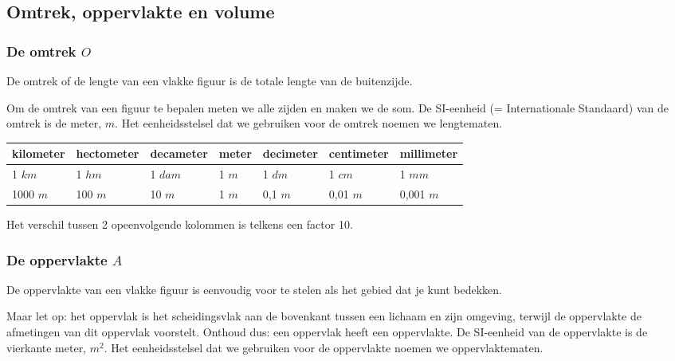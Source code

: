 \subsection{Omtrek, oppervlakte en volume}

\subsubsection{De omtrek $O$}
\begin{definitie}
	De omtrek of de lengte van een vlakke figuur is de totale lengte van de buitenzijde.
\end{definitie} 
Om de omtrek van een figuur te bepalen meten we alle zijden en maken we de som. De SI-eenheid (= Internationale Standaard) van de omtrek is de meter, $m$. Het eenheidsstelsel dat we gebruiken voor de omtrek noemen we lengtematen.

\begin{center}
\begin{tabular}{lllllll}
kilometer & hectometer & decameter & meter & decimeter & centimeter & millimeter \\
\hline
1 $km$ & 1 $hm$ & 1 $dam$ & 1 $m$ & 1 $dm$ & 1 $cm$ & 1 $mm$ \\
1000 $m$ & 100 $m$ & 10 $m$ & 1 $m$ & 0,1 $m$ & 0,01 $m$ & 0,001 $m$ 
\end{tabular}
\end{center}


\begin{opmerking}
	Het verschil tussen 2 opeenvolgende kolommen is telkens een factor 10.
\end{opmerking}

\subsubsection{De oppervlakte $A$}
\begin{definitie}
	De oppervlakte van een vlakke figuur is eenvoudig voor te stelen als het gebied dat je kunt bedekken. 

\end{definitie}
Maar let op: het oppervlak is het scheidingsvlak aan de bovenkant tussen een lichaam en zijn omgeving, terwijl de oppervlakte de afmetingen van dit oppervlak voorstelt. 
Onthoud dus: een oppervlak heeft een oppervlakte. De SI-eenheid van de oppervlakte is de vierkante meter, $m^2$. Het eenheidsstelsel dat we gebruiken voor de oppervlakte noemen we oppervlaktematen.

